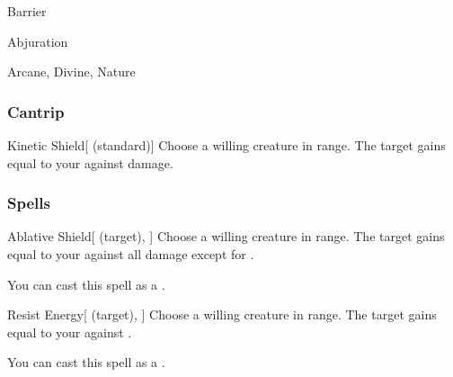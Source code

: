 \newpage
\begin{spellsection}{Barrier}

\begin{spellheader}
\end{spellheader}


 Abjuration

 Arcane, Divine, Nature

\subsubsection{Cantrip}


\begin{freeability}{Kinetic Shield}[ (standard)]
Choose a willing creature in \rngclose range.
The target gains  equal to your  against  damage.
\end{freeability}

\end{spellsection}


\subsubsection{Spells}


\lowercase{\hypertarget{spell:Ablative Shield}{}}\label{spell:Ablative Shield}
\begin{attuneability}[\nth{1}]{\hypertarget{spell:Ablative Shield}{Ablative Shield}}[ (target), ]
Choose a willing creature in \rngclose range.
The target gains  equal to your  against all damage except for .

You can cast this spell as a .
\end{attuneability}
\vspace{0.25em}



\lowercase{\hypertarget{spell:Resist Energy}{}}\label{spell:Resist Energy}
\begin{attuneability}[\nth{1}]{\hypertarget{spell:Resist Energy}{Resist Energy}}[ (target), ]
Choose a willing creature in \rngclose range.
The target gains  equal to your  against .

You can cast this spell as a .
\end{attuneability}
\vspace{0.25em}



